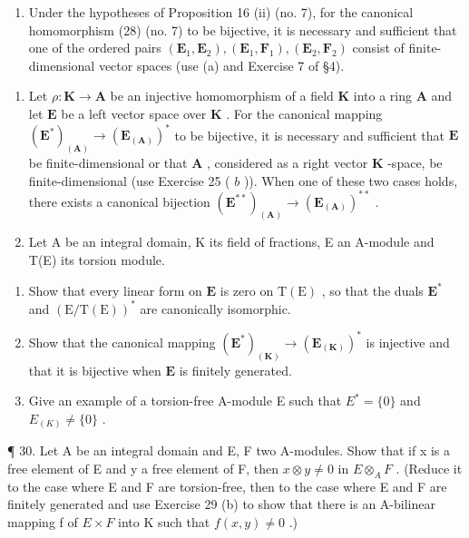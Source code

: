 \begin{enumerate}
\def\labelenumi{(\alph{enumi})}
\setcounter{enumi}{1}
\tightlist
\item
  Under the hypotheses of Proposition 16 (ii) (no. 7), for the canonical homomorphism (28) (no. 7) to be bijective, it is necessary and sufficient that one of the ordered pairs \((\mathbf{E}_1, \mathbf{E}_2), (\mathbf{E}_1, \mathbf{F}_1), (\mathbf{E}_2, \mathbf{F}_2)\) consist of finite-dimensional vector spaces (use (a) and Exercise 7 of §4).
\end{enumerate}

\begin{enumerate}
\def\labelenumi{\arabic{enumi}.}
\setcounter{enumi}{27}
\item
  Let \(\rho: \mathbf{K} \to \mathbf{A}\) be an injective homomorphism of a field \(\mathbf{K}\) into a ring \(\mathbf{A}\) and let \(\mathbf{E}\) be a left vector space over \(\mathbf{K}\) . For the canonical mapping \((\mathbf{E}^*)_{(\mathbf{A})} \to (\mathbf{E}_{(\mathbf{A})})^*\) to be bijective, it is necessary and sufficient that \(\mathbf{E}\) be finite-dimensional or that \(\mathbf{A}\) , considered as a right vector \(\mathbf{K}\) -space, be finite-dimensional (use Exercise 25 ( \(b\) )). When one of these two cases holds, there exists a canonical bijection \((\mathbf{E}^{**})_{(\mathbf{A})} \to (\mathbf{E}_{(\mathbf{A})})^{**}\) .
\item
  Let A be an integral domain, K its field of fractions, E an A-module and T(E) its torsion module.
\end{enumerate}

\begin{enumerate}
\def\labelenumi{(\alph{enumi})}
\item
  Show that every linear form on \(\mathbf{E}\) is zero on \(\mathrm{T}(\mathrm{E})\) , so that the duals \(\mathbf{E}^*\) and \((\mathrm{E} / \mathrm{T}(\mathrm{E}))^*\) are canonically isomorphic.
\item
  Show that the canonical mapping \((\mathbf{E}^{*})_{(\mathbf{K})}\to (\mathbf{E}_{(\mathbf{K})})^{*}\) is injective and that it is bijective when \(\mathbf{E}\) is finitely generated.
\item
  Give an example of a torsion-free A-module E such that \(E^{*} = \{0\}\) and \(E_{(K)} \neq \{0\}\) .
\end{enumerate}

¶ 30. Let A be an integral domain and E, F two A-modules. Show that if x is a free element of E and y a free element of F, then \(x \otimes y \neq 0\) in \(E \otimes_{A} F\) . (Reduce it to the case where E and F are torsion-free, then to the case where E and F are finitely generated and use Exercise 29 (b) to show that there is an A-bilinear mapping f of \(E \times F\) into K such that \(f(x, y) \neq 0\) .)

